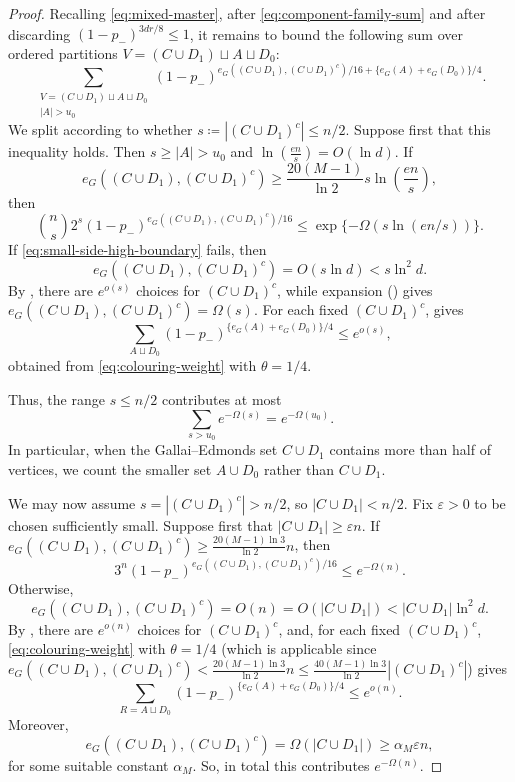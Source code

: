 \documentclass[10pt,a4paper]{amsart}
\begin{document}
\begin{proof}
Recalling \eqref{eq:mixed-master}, after \eqref{eq:component-family-sum} and after discarding $(1-p_-)^{3dr/8}\le1$, it remains to bound the following sum over ordered partitions $V=(C \cup D_1)\sqcup A\sqcup D_0$:
\begin{equation}\label{eq:ordered-partition-sum}
  \sum_{\substack{V=(C \cup D_1)\sqcup A\sqcup D_0\\
 |A|>u_0}}  (1-p_-)^{e_G((C \cup D_1), (C \cup D_1)^c)/16+\{e_G(A)+e_G(D_0)\}/4}.  
\end{equation}
We split according to whether $s \coloneqq |(C \cup D_1)^c|\le n/2$. Suppose first that this inequality holds. Then $s\ge |A|>u_0$ and $\ln\left(\frac{en}{s}\right)=O(\ln d)$.
If
\begin{equation}\label{eq:small-side-high-boundary}
 e_G((C \cup D_1), (C \cup D_1)^c) \ge \frac{20(M-1)}{\ln 2}s\ln\left(\frac{en}{s}\right),
\end{equation}
then
\[
 \binom ns2^s (1-p_-)^{e_G((C \cup D_1), (C \cup D_1)^c)/16}
 \le \exp\{-\Omega(s\ln(en/s))\}.
\]
If \eqref{eq:small-side-high-boundary} fails, then
\[
 e_G((C \cup D_1), (C \cup D_1)^c)=O(s\ln d)<s\ln^2 d.
\]
By , there are $e^{o(s)}$ choices for $(C \cup D_1)^c$, while expansion () gives $e_G((C \cup D_1), (C \cup D_1)^c)= \Omega(s)$.
For each fixed $(C \cup D_1)^c$,  gives
\[
 \sum_{A\sqcup D_0}  (1-p_-)^{\{e_G(A)+e_G(D_0)\}/4}\le e^{o(s)},
\]
obtained from \eqref{eq:colouring-weight} with $\theta=1/4$.

Thus, the range $s \leq n/2$ contributes at most
\begin{equation}\label{eq:small-side-sum}
 \sum_{s>u_0}e^{-\Omega(s)}=e^{-\Omega(u_0)}.
\end{equation}
In particular, when the Gallai--Edmonds set $C \cup D_1$ contains more than half of vertices, we count the smaller set $A\cup D_0$ rather than $C \cup D_1$.

We may now assume $s=|(C \cup D_1)^c|>n/2$, so $|C \cup D_1|<n/2$.
Fix $\varepsilon>0$ to be chosen sufficiently small. Suppose first that $|C \cup D_1|\ge\varepsilon n$.
If $e_G((C \cup D_1), (C \cup D_1)^c)\ge \frac{20(M-1) \ln 3}{\ln 2}n$, then
\[
 3^n (1-p_-)^{e_G((C \cup D_1), (C \cup D_1)^c)/16}\le e^{-\Omega(n)}.
\]
Otherwise,
\[
 e_G((C \cup D_1), (C \cup D_1)^c)=O(n)=O(|C \cup D_1|)< |C \cup D_1|\ln^2 d.
\]
By , there are $e^{o(n)}$ choices for $(C \cup D_1)^c$, and, for each fixed $(C \cup D_1)^c$, \eqref{eq:colouring-weight} with $\theta=1/4$ (which is applicable since $e_G((C \cup D_1), (C \cup D_1)^c)<\frac{20(M-1) \ln 3}{\ln 2}n\le\frac{40(M-1) \ln 3}{\ln 2}|(C \cup D_1)^c|$) gives
\[
 \sum_{R=A\sqcup D_0}
 (1-p_-)^{\{e_G(A)+e_G(D_0)\}/4}\le e^{o(n)}.
\]
Moreover,
\[
 e_G((C \cup D_1), (C \cup D_1)^c)=\Omega(|C \cup D_1|)\ge \alpha_M\varepsilon n,
\]
for some suitable constant $\alpha_M$.
So, in total this contributes $e^{-\Omega(n)}$.


\end{proof}
\end{document}
